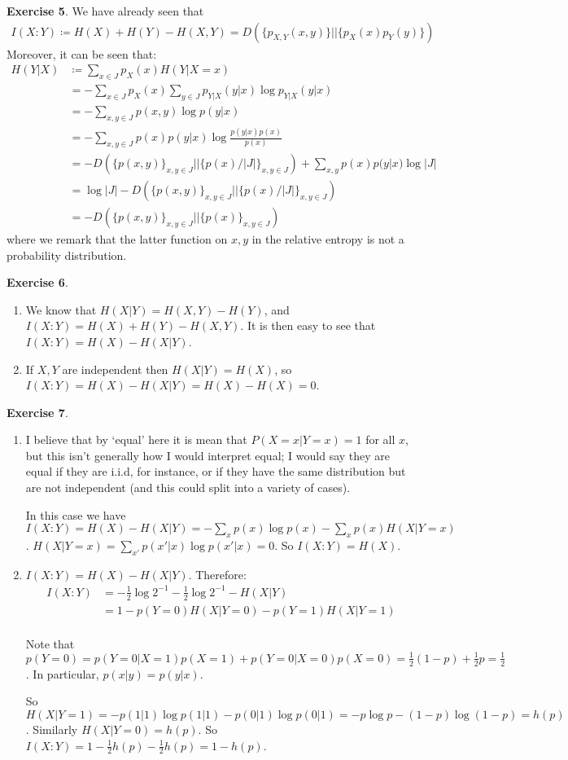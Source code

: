 \documentclass[]{article}
\begin{document}
\textbf{Exercise 5}. We have already seen that
\begin{align*}
    I(X:Y) \coloneqq H(X) + H(Y) - H(X,Y) = D(\{p_{X,Y}(x,y)\}||\{p_X(x)p_Y(y)\})
\end{align*}
Moreover, it can be seen that:
\begin{align*}
    H(Y|X) &\coloneqq \sum_{x\in J} p_X(x) H(Y|X = x)\\
    &= - \sum_{x\in J}p_X(x)\sum_{y\in J}p_{Y|X}(y|x)\log p_{Y|X}(y|x)\\
    &= - \sum_{x,y\in J}p(x,y)\log p(y|x)\\
    &= - \sum_{x,y\in J} p(x)p(y|x)\log \frac{p(y|x)p(x)}{p(x)}\\
    &= - D(\{p(x,y)\}_{x,y\in J} || \{p(x)/|J|\}_{x,y\in J}) + \sum_{x,y}p(x)p(y|x)\log |J|\\
    &= \log |J| - D(\{p(x,y)\}_{x,y\in J} || \{p(x)/|J|\}_{x,y\in J})\\
    &= - D(\{p(x,y)\}_{x,y\in J}|| \{p(x)\}_{x,y\in J})
\end{align*}
where we remark that the latter function on $x,y$ in the relative entropy is not a probability distribution.

\textbf{Exercise 6}.\ 
\begin{enumerate}
    \item We know that $H(X|Y) = H(X,Y) - H(Y)$, and $I(X:Y) = H(X) + H(Y) - H(X,Y)$. It is then easy to see that $I(X:Y) = H(X) - H(X|Y)$.
    \item If $X,Y$ are independent then $H(X|Y) = H(X)$, so $I(X:Y) = H(X) - H(X|Y) = H(X) - H(X) = 0$.
\end{enumerate}

\textbf{Exercise 7}.\ 
\begin{enumerate}
    \item I believe that by `equal' here it is mean that $P(X = x | Y = x) = 1$ for all $x$, but this isn't generally how I would interpret equal; I would say they are equal if they are i.i.d, for instance, or if they have the same distribution but are not independent (and this could split into a variety of cases).
    
    In this case we have $I(X:Y) = H(X) - H(X|Y) = -\sum_x p(x)\log p(x) - \sum_{x} p(x)H(X| Y = x)$. $H(X| Y = x) = \sum_{x'}p(x'|x)\log p(x'|x) = 0$. So $I(X:Y) = H(X)$.

    \item $I(X:Y) = H(X)  - H(X|Y)$. Therefore:
    \begin{align*}
        I(X:Y) &= -\frac{1}{2}\log 2^{-1} - \frac{1}{2}\log 2^{-1} - H(X|Y)\\
        &= 1 - p(Y=0)H(X|Y = 0) - p(Y=1)H(X| Y = 1)\\
    \end{align*}

    Note that $p(Y=0) = p(Y= 0 | X = 1) p(X=1) + p(Y= 0 | X = 0) p(X = 0) = \frac{1}{2}(1-p) + \frac{1}{2}p = \frac{1}{2}$. In particular, $p(x|y) = p(y|x)$.

    So $H(X | Y = 1) = -p(1|1) \log p(1|1) - p(0|1)\log p(0 | 1) = -p\log p - (1-p)\log (1-p) = h(p)$. Similarly $H(X|Y = 0) = h(p)$. So $I(X:Y) = 1 - \frac{1}{2}h(p) - \frac{1}{2}h(p) = 1 - h(p)$.
\end{enumerate}
\end{document}
